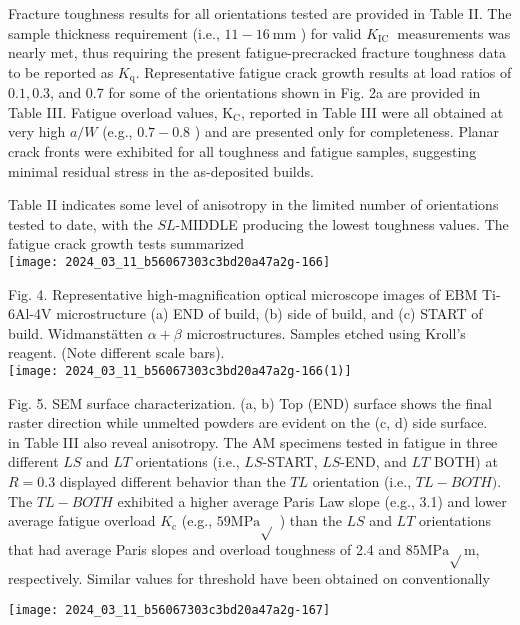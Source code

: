 \documentclass[10pt]{article}
\begin{document}
Fracture toughness results for all orientations tested are provided in Table II. The sample thickness requirement (i.e., $11-16 \mathrm{~mm}$ ) for valid $K_{\text {IC }}$ measurements was nearly met, thus requiring the present fatigue-precracked fracture toughness data to be reported as $K_{\mathrm{q}}$. Representative fatigue crack growth results at load ratios of $0.1,0.3$, and 0.7 for some of the orientations shown in Fig. 2a are provided in Table III. Fatigue overload values, $\mathrm{K}_{\mathrm{C}}$, reported in Table III were all obtained at very high $a / W$ (e.g., $0.7-0.8$ ) and are presented only for completeness. Planar crack fronts were exhibited for all toughness and fatigue samples, suggesting minimal residual stress in the as-deposited builds.

Table II indicates some level of anisotropy in the limited number of orientations tested to date, with the $S L$-MIDDLE producing the lowest toughness values. The fatigue crack growth tests summarized\\
\texttt{[image: 2024\_03\_11\_b56067303c3bd20a47a2g-166]}

Fig. 4. Representative high-magnification optical microscope images of EBM Ti-6Al-4V microstructure (a) END of build, (b) side of build, and (c) START of build. Widmanstätten $\alpha+\beta$ microstructures. Samples etched using Kroll's reagent. (Note different scale bars).\\
\texttt{[image: 2024\_03\_11\_b56067303c3bd20a47a2g-166(1)]}

Fig. 5. SEM surface characterization. (a, b) Top (END) surface shows the final raster direction while unmelted powders are evident on the (c, d) side surface.\\
in Table III also reveal anisotropy. The AM specimens tested in fatigue in three different $L S$ and $L T$ orientations (i.e., $L S$-START, $L S$-END, and $L T$ BOTH) at $R=0.3$ displayed different behavior than the $T L$ orientation (i.e., $T L-B O T H)$. The $T L-B O T H$ exhibited a higher average Paris Law slope (e.g., 3.1) and lower average fatigue overload $K_{\mathrm{c}}$ (e.g., $59 \mathrm{MPa} \sqrt{ }$ ) than the $L S$ and $L T$ orientations that had average Paris slopes and overload toughness of 2.4 and $85 \mathrm{MPa} \sqrt{ } \mathrm{m}$, respectively. Similar values for threshold have been obtained on conventionally

\begin{center}
\texttt{[image: 2024\_03\_11\_b56067303c3bd20a47a2g-167]}
\end{center}
\end{document}
